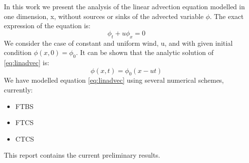 
In this work we present the analysis of the linear advection equation modelled in one dimension, x, without sources or sinks of the advected variable $\phi$. The exact expression of the equation is:
\begin{equation}
\phi_{t}+u\phi_{x}=0
\label{eq:linadvec}
\end{equation}
We consider the case of constant and uniform wind, u, and with given initial condition $\phi(x,0)=\phi_{0}$.
It can be shown that the analytic solution of \ref{eq:linadvec} is:
\begin{equation} \label{eq:linadvec_initcondition}
\phi(x,t)=\phi_{0}(x-ut)
\end{equation}
We have modelled equation \eqref{eq:linadvec} using several numerical schemes, currently:
\begin{itemize}
	\item FTBS
	\item FTCS
	\item CTCS
\end{itemize}
This report contains the current preliminary results.